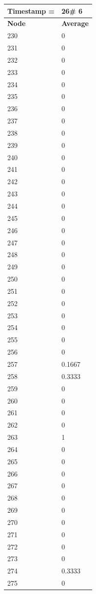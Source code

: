 \begin{tabular}{|l||l|}
\hline
\textbf{Timestamp =} & \textbf{26}\# 6\\\hline
	\textbf{Node} & \textbf{Average} \\ \hline
\hline
	230 & 0 \\ \hline
	231 & 0 \\ \hline
	232 & 0 \\ \hline
	233 & 0 \\ \hline
	234 & 0 \\ \hline
	235 & 0 \\ \hline
	236 & 0 \\ \hline
	237 & 0 \\ \hline
	238 & 0 \\ \hline
	239 & 0 \\ \hline
	240 & 0 \\ \hline
	241 & 0 \\ \hline
	242 & 0 \\ \hline
	243 & 0 \\ \hline
	244 & 0 \\ \hline
	245 & 0 \\ \hline
	246 & 0 \\ \hline
	247 & 0 \\ \hline
	248 & 0 \\ \hline
	249 & 0 \\ \hline
	250 & 0 \\ \hline
	251 & 0 \\ \hline
	252 & 0 \\ \hline
	253 & 0 \\ \hline
	254 & 0 \\ \hline
	255 & 0 \\ \hline
	256 & 0 \\ \hline
	257 & 0.1667 \\ \hline
	258 & 0.3333 \\ \hline
	259 & 0 \\ \hline
	260 & 0 \\ \hline
	261 & 0 \\ \hline
	262 & 0 \\ \hline
	263 & 1 \\ \hline
	264 & 0 \\ \hline
	265 & 0 \\ \hline
	266 & 0 \\ \hline
	267 & 0 \\ \hline
	268 & 0 \\ \hline
	269 & 0 \\ \hline
	270 & 0 \\ \hline
	271 & 0 \\ \hline
	272 & 0 \\ \hline
	273 & 0 \\ \hline
	274 & 0.3333 \\ \hline
	275 & 0 \\ \hline
\end{tabular}

